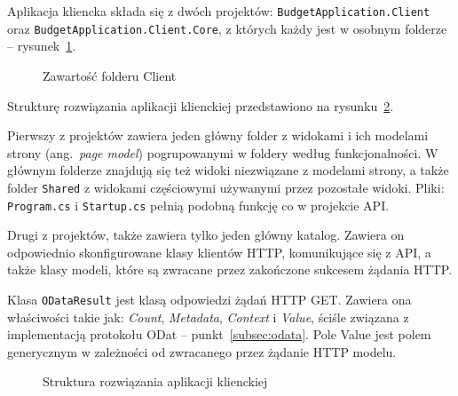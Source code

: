 Aplikacja kliencka składa się z dwóch projektów: \texttt{BudgetApplication.Client} oraz \texttt{BudgetApplication.Client.Core}, z których każdy jest w osobnym folderze -- rysunek~\ref{fig:fiz-client-1}. 

\begin{figure}[t]
	\centering
	\caption{Zawartość folderu Client}
	\label{fig:fiz-client-1}
\end{figure}

Strukturę rozwiązania aplikacji klienckiej przedstawiono na rysunku~\ref{fig:fiz-client-2}.

Pierwszy z projektów zawiera jeden główny folder z widokami i ich modelami strony (ang.~\emph{page model}) pogrupowanymi w foldery według funkcjonalności. W głównym folderze znajdują się też widoki niezwiązane z modelami strony, a także folder \texttt{Shared} z widokami częściowymi używanymi przez pozostałe widoki. Pliki: \texttt{Program.cs} i \texttt{Startup.cs} pełnią podobną funkcję co w projekcie API.

Drugi z projektów, także zawiera tylko jeden główny katalog. Zawiera on odpowiednio skonfigurowane klasy klientów HTTP, komunikujące się z API, a także klasy modeli, które są zwracane przez zakończone sukcesem żądania HTTP.

Klasa \texttt{ODataResult} jest klasą odpowiedzi żądań HTTP GET. Zawiera ona właściwości takie jak: \emph{Count}, \emph{Metadata}, \emph{Context} i \emph{Value}, ściśle związana z implementacją protokołu ODat -- punkt~\ref{subsec:odata}. Pole Value jest polem generycznym w zależności od zwracanego przez żądanie HTTP modelu. 

\begin{figure}[t]
	\centering
	\caption{Struktura rozwiązania aplikacji klienckiej}
	\label{fig:fiz-client-2}
\end{figure}

